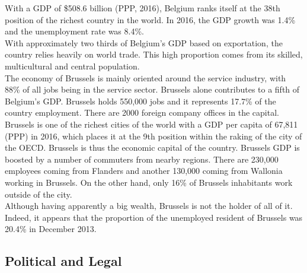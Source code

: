 \documentclass[12pt,a4paper,oneside]{book}
\begin{document}
With a GDP of \$508.6 billion (PPP, 2016), Belgium ranks itself at the 38th position of the richest country in the world. In 2016, the GDP growth was 1.4\% and the unemployment rate was 8.4\%.\\

With approximately two thirds of Belgium's GDP based on exportation, the country relies heavily on world trade. This high proportion comes from its skilled, multicultural and central population.\cite{ciafb}\\

The economy of Brussels is mainly oriented around the service industry, with 88\% of all jobs being in the service sector. Brussels alone contributes to a fifth of Belgium's GDP. Brussels holds 550,000 jobs and it represents 17.7\% of the country employment. There are 2000 foreign company offices in the capital.\cite{bxinfo}\\

Brussels is one of the richest cities of the world with a GDP per capita of 67,811 (PPP) in 2016, which places it at the 9th position within the raking of the city of the OECD.\cite{oecdstat} Brussels is thus the economic capital of the country. Brussels GDP is boosted by a number of commuters from nearby regions. There are 230,000 employees coming from Flanders and another 130,000 coming from Wallonia working in Brussels. On the other hand, only 16\% of Brussels inhabitants work outside of the city.\cite{euresCom}\\

Although having apparently a big wealth, Brussels is not the holder of all of it. Indeed, it appears that the proportion of the unemployed resident of Brussels was 20.4\% in December 2013.

\subsection{Political and Legal}


\end{document}
